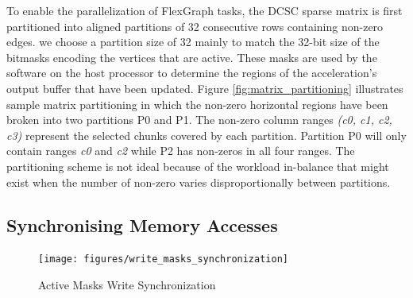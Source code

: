 To enable the parallelization of FlexGraph tasks, the DCSC sparse matrix is first partitioned into aligned partitions of 32 consecutive rows containing non-zero edges. we choose a partition size of 32 mainly to match the 32-bit size of the bitmasks encoding the vertices that are active. These masks are used by the software on the host processor to determine the regions of the acceleration's output buffer that have been updated. Figure \ref{fig:matrix_partitioning} illustrates sample matrix partitioning in which the non-zero horizontal regions have been broken into two partitions P0 and P1. The non-zero column ranges \textit{(c0, c1, c2, c3)} represent the selected chunks covered by each partition. Partition P0 will only contain ranges \textit{c0} and \textit{c2} while P2 has non-zeros in all four ranges. The partitioning scheme is not ideal because of the workload in-balance that might exist when the number of non-zero varies disproportionally between partitions.  

\subsection{Synchronising Memory Accesses}

\begin{figure}[htbp]
\centering
\texttt{[image: figures/write\_masks\_synchronization]}
\caption{Active Masks Write Synchronization}
\label{fig:write_masks_synchronization}
\end{figure}


